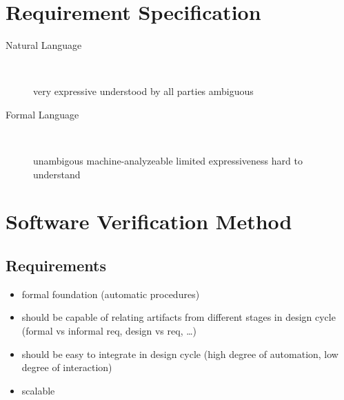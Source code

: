 \documentclass[a4paper, 10pt]{article}
\begin{document}
\section*{Requirement Specification}
\begin{description}
    \item[Natural Language] \ \\
    \begin{itemize}
        \good very expressive
        \good understood by all parties
        \bad ambiguous
    \end{itemize}
    \item[Formal Language] \ \\
    \begin{itemize}
        \good unambigous
        \good machine-analyzeable
        \bad limited expressiveness
        \bad hard to understand
    \end{itemize}
\end{description}

\section*{Software Verification Method}
\subsection*{Requirements}
\begin{itemize}
    \item formal foundation (automatic procedures)
    \item should be capable of relating artifacts from different stages in design cycle (formal vs informal req, design vs req, \dots)
    \item should be easy to integrate in design cycle (high degree of automation, low degree of interaction)
    \item scalable
\end{itemize}
\end{document}
